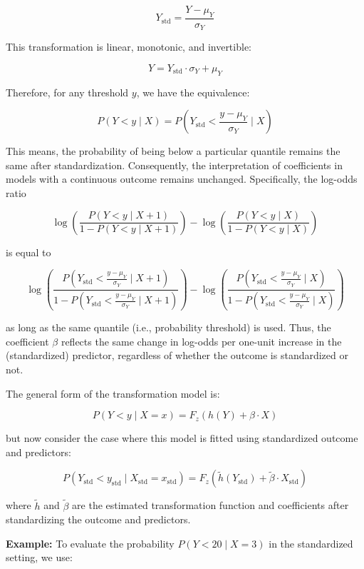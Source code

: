 \[
Y_{\text{std}} = \frac{Y - \mu_Y}{\sigma_Y}
\]

This transformation is linear, monotonic, and invertible:

\[
Y = Y_{\text{std}} \cdot \sigma_Y + \mu_Y
\]

Therefore, for any threshold $y$, we have the equivalence:

\[
P(Y < y \mid X) = P\left(Y_{\text{std}} < \frac{y - \mu_Y}{\sigma_Y} \mid X\right)
\]


This means, the probability of being below a particular quantile remains the same after standardization. Consequently, the interpretation of coefficients in models with a continuous outcome remains unchanged. Specifically, the log-odds ratio


\[
\log \left( \frac{P(Y < y \mid X + 1)}{1 - P(Y < y \mid X + 1)} \right) -
\log \left( \frac{P(Y < y \mid X)}{1 - P(Y < y \mid X)} \right)
\]

is equal to

\[
\log \left( \frac{P\left(Y_{\text{std}} < \frac{y - \mu_Y}{\sigma_Y} \mid X + 1\right)}{1 - P\left(Y_{\text{std}} < \frac{y - \mu_Y}{\sigma_Y} \mid X + 1\right)} \right) -
\log \left( \frac{P\left(Y_{\text{std}} < \frac{y - \mu_Y}{\sigma_Y} \mid X\right)}{1 - P\left(Y_{\text{std}} < \frac{y - \mu_Y}{\sigma_Y} \mid X\right)} \right)
\]

as long as the same quantile (i.e., probability threshold) is used. Thus, the coefficient $\beta$ reflects the same change in log-odds per one-unit increase in the (standardized) predictor, regardless of whether the outcome is standardized or not.


The general form of the transformation model is:


\[
P(Y < y \mid X = x) = F_z\left(h(Y) + \beta \cdot X\right)
\]

but now consider the case where this model is fitted using standardized outcome and predictors:

\[
P(Y_{\text{std}} < y_{\text{std}} \mid X_{\text{std}} = x_{\text{std}}) = F_z\left(\tilde{h}(Y_{\text{std}}) + \tilde{\beta} \cdot X_{\text{std}}\right)
\]


where $\tilde{h}$ and $\tilde{\beta}$ are the estimated transformation function and coefficients after standardizing the outcome and predictors.



\textbf{Example:} To evaluate the probability \( P(Y < 20 \mid X = 3) \) in the standardized setting, we use:


